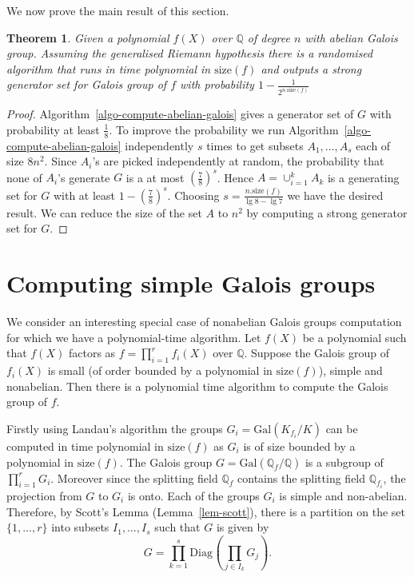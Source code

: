\documentclass[11pt]{madras}%
\newtheorem{theorem}{Theorem}[chapter]
\theoremstyle{remark}
\newcommand{\Gal}[1]{{\ensuremath{\mathrm{Gal}\left(#1\right)}}}
\newcommand{\size}[1]{{\ensuremath{\mathrm{size}\left(#1\right)}}}
\newcommand{\Diag}[2][]{{\ensuremath{\mathrm{Diag}_{{#1}}\left(#2\right)}}}
\newcommand{\bigtimes}{\prod}
\begin{document}
We now prove the main result of this section.

\begin{theorem}
  Given a polynomial $f(X)$ over $\mathbb{Q}$ of degree $n$ with
  abelian Galois group. Assuming the generalised Riemann hypothesis
  there is a randomised algorithm that runs in time polynomial in
  $\size{f}$ and outputs a strong generator set for Galois group of
  $f$ with probability $1 - \frac{1}{2^{n.\size{f}}}$
\end{theorem}
\begin{proof}
  Algorithm~\ref{algo-compute-abelian-galois} gives a generator set of
  $G$ with probability at least $\frac{1}{8}$. To improve the
  probability we run Algorithm~\ref{algo-compute-abelian-galois}
  independently $s$ times to get subsets $A_1,\ldots,A_s$ each of size
  $8n^2$. Since $A_i$'s are picked independently at random, the
  probability that none of $A_i$'s generate $G$ is a at most
  $\left(\frac{7}{8}\right)^s$.  Hence $A = \cup_{i=1}^k A_k$ is a
  generating set for $G$ with at least $1 - (\frac{7}{8})^s$.
  Choosing $s = \frac{n.\size{f}}{\lg{8} - \lg{7}}$ we have the
  desired result. We can reduce the size of the set $A$ to $n^2$ by
  computing a strong generator set for $G$.
\end{proof}

\section{Computing simple Galois groups}\label{sect-simple-galois}

We consider an interesting special case of nonabelian Galois groups
computation for which we have a polynomial-time algorithm.  Let $f(X)$
be a polynomial such that $f(X)$ factors as $f=\prod_{i=1}^r f_i(X)$
over $\mathbb{Q}$.  Suppose the Galois group of $f_i(X)$ is small (of
order bounded by a polynomial in $\size{f}$), simple and nonabelian.
Then there is a polynomial time algorithm to compute the Galois group
of $f$.

Firstly using Landau's algorithm the groups $G_i= \Gal{K_{f_i}/K}$ can
be computed in time polynomial in $\size{f}$ as $G_i$ is of size
bounded by a polynomial in $\size{f}$.  The Galois group $G =
\Gal{\mathbb{Q}_f/\mathbb{Q}}$ is a subgroup of $\prod_{i=1}^r G_i$.
Moreover since the splitting field $\mathbb{Q}_f$ contains the
splitting field $\mathbb{Q}_{f_i}$, the projection from $G$ to $G_i$
is onto.  Each of the groups $G_i$ is simple and non-abelian.
Therefore, by Scott's Lemma (Lemma~\ref{lem-scott}), there is a
partition on the set $\{1,\ldots,r\}$ into subsets $I_1,\ldots, I_s$
such that $G$ is given by
\[
G = \prod_{k=1}^s \Diag{ \bigtimes_{j \in I_k} G_j}.
\]
\end{document}
